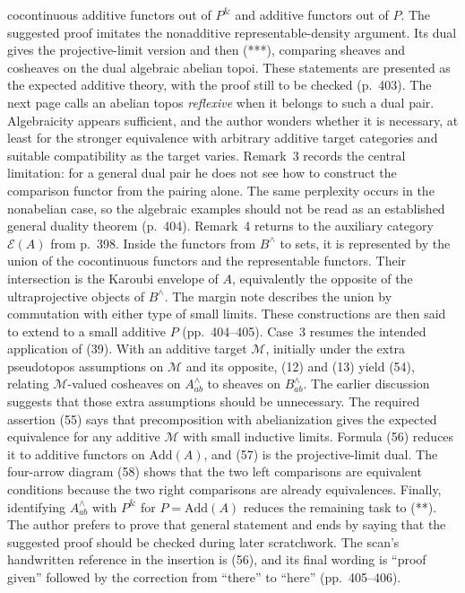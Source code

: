 \documentclass[10pt,oneside]{book}
\begin{document}
cocontinuous additive functors out of $P^{\&}$ and additive functors out of $P$. The suggested proof imitates the nonadditive representable-density argument. Its dual gives the projective-limit version and then (***), comparing sheaves and cosheaves on the dual algebraic abelian topoi. These statements are presented as the expected additive theory, with the proof still to be checked (p.\ 403). The next page calls an abelian topos \emph{reflexive} when it belongs to such a dual pair. Algebraicity appears sufficient, and the author wonders whether it is necessary, at least for the stronger equivalence with arbitrary additive target categories and suitable compatibility as the target varies. Remark~3 records the central limitation: for a general dual pair he does not see how to construct the comparison functor from the pairing alone. The same perplexity occurs in the nonabelian case, so the algebraic examples should not be read as an established general duality theorem (p.\ 404). Remark~4 returns to the auxiliary category $\mathcal E(A)$ from p.\ 398. Inside the functors from $B^\wedge$ to sets, it is represented by the union of the cocontinuous functors and the representable functors. Their intersection is the Karoubi envelope of $A$, equivalently the opposite of the ultraprojective objects of $B^\wedge$. The margin note describes the union by commutation with either type of small limits. These constructions are then said to extend to a small additive $P$ (pp.\ 404--405). Case~3 resumes the intended application of (39). With an additive target $\mathcal M$, initially under the extra pseudotopos assumptions on $\mathcal M$ and its opposite, (12) and (13) yield (54), relating $\mathcal M$-valued cosheaves on $A^\wedge_{ab}$ to sheaves on $B^\wedge_{ab}$. The earlier discussion suggests that those extra assumptions should be unnecessary. The required assertion (55) says that precomposition with abelianization gives the expected equivalence for any additive $\mathcal M$ with small inductive limits. Formula (56) reduces it to additive functors on $\mathrm{Add}(A)$, and (57) is the projective-limit dual. The four-arrow diagram (58) shows that the two left comparisons are equivalent conditions because the two right comparisons are already equivalences. Finally, identifying $A^\wedge_{ab}$ with $P^{\&}$ for $P=\mathrm{Add}(A)$ reduces the remaining task to (**). The author prefers to prove that general statement and ends by saying that the suggested proof should be checked during later scratchwork. The scan's handwritten reference in the insertion is (56), and its final wording is “proof given” followed by the correction from “there” to “here” (pp.\ 405--406).
\end{document}
